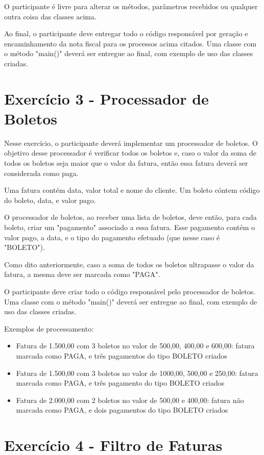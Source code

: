 O participante é livre para alterar os métodos, parâmetros recebidos ou qualquer outra coisa das classes acima.

Ao final, o participante deve entregar todo o código responsável por geração e encaminhamento da nota fiscal 
para os processos acima citados. Uma classe com o método "main()" deverá ser entregue ao final, com
exemplo de uso das classes criadas.

\section{Exercício 3 - Processador de Boletos}

Nesse exercício, o participante deverá implementar um processador de boletos. O objetivo desse processador
é verificar todos os boletos e, caso o valor da soma de todos os boletos seja maior que o valor
da fatura, então essa fatura deverá ser considerada como paga.

Uma fatura contém data, valor total e nome do cliente. Um boleto cóntem código do boleto, data, e valor pago.

O processador de boletos, ao receber uma lista de boletos, deve então, para cada boleto, criar um
"pagamento" associado a essa fatura. Esse pagamento contém o valor pago, a data, e o tipo do pagamento efetuado
(que nesse caso é "BOLETO").

Como dito anteriormente, caso a soma de todos os boletos ultrapasse o valor da fatura, a mesma deve
ser marcada como "PAGA".

O participante deve criar todo o código responsável pelo processador de boletos. Uma classe com
o método "main()" deverá ser entregue ao final, com exemplo de uso das classes criadas.

Exemplos de processamento:

\begin{itemize}
	\item Fatura de 1.500,00 com 3 boletos no valor de 500,00, 400,00 e 600,00: fatura marcada como PAGA, e três pagamentos do tipo BOLETO criados 
	\item Fatura de 1.500,00 com 3 boletos no valor de 1000,00, 500,00 e 250,00: fatura marcada como PAGA, e três pagamento do tipo BOLETO criados
	\item Fatura de 2.000,00 com 2 boletos no valor de 500,00 e 400,00: fatura não marcada como PAGA, e dois pagamentos do tipo BOLETO criados 
\end{itemize}

\section{Exercício 4 - Filtro de Faturas}

